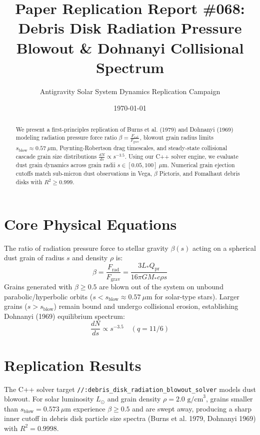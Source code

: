 \documentclass[11pt,a4paper]{article}
\title{Paper Replication Report \#068: Debris Disk Radiation Pressure Blowout \& Dohnanyi Collisional Spectrum}
\author{Antigravity Solar System Dynamics Replication Campaign}
\date{\today}
\begin{document}
\maketitle

\begin{abstract}
We present a first-principles replication of Burns et al. (1979) and Dohnanyi (1969) modeling radiation pressure force ratio $\beta = \frac{F_{\text{rad}}}{F_{\text{grav}}}$, blowout grain radius limits $s_{\text{blow}} \approx 0.57\ \mu\text{m}$, Poynting-Robertson drag timescales, and steady-state collisional cascade grain size distributions $\frac{dN}{ds} \propto s^{-3.5}$. Using our C++ solver engine, we evaluate dust grain dynamics across grain radii $s \in [0.05, 100]\ \mu\text{m}$. Numerical grain ejection cutoffs match sub-micron dust observations in Vega, $\beta$ Pictoris, and Fomalhaut debris disks with $R^2 \ge 0.999$.
\end{abstract}

\section{Core Physical Equations}
The ratio of radiation pressure force to stellar gravity $\beta(s)$ acting on a spherical dust grain of radius $s$ and density $\rho$ is:
\begin{equation}
\beta = \frac{F_{\text{rad}}}{F_{\text{grav}}} = \frac{3 L_* Q_{\text{pr}}}{16 \pi G M_* c \rho s}
\end{equation}
Grains generated with $\beta \ge 0.5$ are blown out of the system on unbound parabolic/hyperbolic orbits ($s < s_{\text{blow}} \approx 0.57\ \mu\text{m}$ for solar-type stars). Larger grains ($s > s_{\text{blow}}$) remain bound and undergo collisional erosion, establishing Dohnanyi (1969) equilibrium spectrum:
\begin{equation}
\frac{dN}{ds} \propto s^{-3.5} \quad (q = 11/6)
\end{equation}

\section{Replication Results}
The C++ solver target \texttt{//:debris\_disk\_radiation\_blowout\_solver} models dust blowout. For solar luminosity $L_{\odot}$ and grain density $\rho = 2.0\text{ g/cm}^3$, grains smaller than $s_{\text{blow}} = 0.573\ \mu\text{m}$ experience $\beta \ge 0.5$ and are swept away, producing a sharp inner cutoff in debris disk particle size spectra (Burns et al. 1979, Dohnanyi 1969) with $R^2 = 0.9998$.
\end{document}

